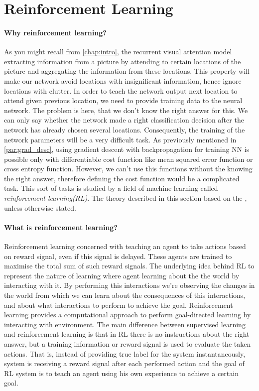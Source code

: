 
\section{Reinforcement Learning}
\paragraph{Why reinforcement learning?}
As you might recall from \autoref{chap:intro}, the recurrent visual attention model
extracting information from a picture by attending to certain locations of the picture
and aggregating the information from these locations. This property will make our network
avoid locations with insignificant information, hence ignore locations with clutter.
In order to teach the network
output next location to attend given previous location, we need to provide training data to
the neural network. The problem is here, that we don't know the right answer for this.
We can only say whether the network made a right classification decision after the network
has already chosen several locations. Consequently, the training of the network parameters will
be a very difficult task. As previously mentioned in \autoref{par:grad_desc}, using gradient descent
with backpropagation for training NN is possible only with differentiable cost function like
mean squared error function or cross entropy function. However, we can't use this functions without
the knowing the right answer, therefore defining the cost function would be a complicated task.
This sort of tasks is studied by a field of machine learning called \emph{reinforcement
learning(RL)}. The theory described in this section based on the
\cite{Sutton2012}, unless otherwise stated.

\paragraph{What is reinforcement learning?}
Reinforcement learning concerned with teaching an agent to take actions based on
reward signal, even if this signal is delayed.
These agents are trained to maximise the total
sum of such reward signals.
The underlying idea behind RL to
represent the nature of learning where agent learning about the the world by interacting
with it. By performing this interactions we're observing the changes in the world
from which we can learn about the consequences of this
interactions, and about what interactions to perform to achieve the goal.
Reinforcement learning provides a computational approach to perform goal-directed learning
by interacting with environment. The main difference between supervised learning and
reinforcement learning is that in RL there is no instructions about the right answer,
but a training information or reward signal is used to evaluate the taken actions.
That is, instead of providing true label for the system instantaneously,
system is receiving a reward signal
after each performed action and the goal of RL system is to teach an agent using his own
experience to achieve a certain goal.

